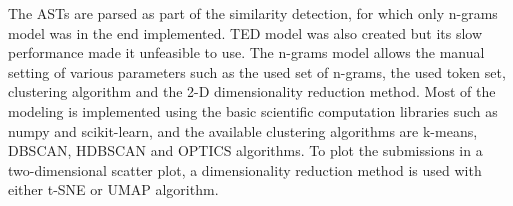 The ASTs are parsed as part of the similarity detection, for which only n-grams model was in the end implemented. TED model was also created but its slow performance made it unfeasible to use. The n-grams model allows the manual setting of various parameters such as the used set of n-grams, the used token set, clustering algorithm and the 2-D dimensionality reduction method. Most of the modeling is implemented using the basic scientific computation libraries such as numpy and scikit-learn, and the available clustering algorithms are k-means, DBSCAN, HDBSCAN and OPTICS algorithms. To plot the submissions in a two-dimensional scatter plot, a dimensionality reduction method is used with either t-SNE or UMAP algorithm.
